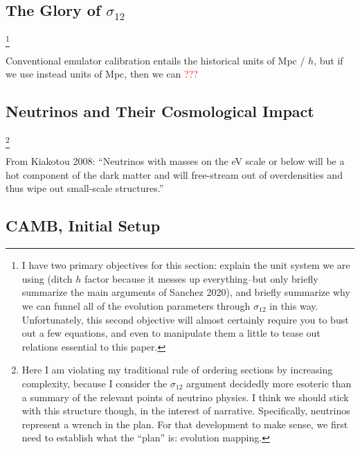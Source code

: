 \documentclass[11pt]{article}
\begin{document}
\begin{centering}
\section*{The Glory of $\sigma_{12}$}
\end{centering}

\footnote{
    I have two primary objectives for this section: explain the unit system
    we are using (ditch $h$ factor because it messes up everything--but
    only briefly summarize the main arguments of Sanchez 2020), and briefly
    summarize why we can funnel all of the evolution parameters through
    $\sigma_{12}$ in this way. Unfortunately, this second objective will
    almost certainly require you to bust out a few equations, and even to
    manipulate them a little to tease out relations essential to this paper.
}

Conventional emulator calibration entails the historical units of Mpc / $h$,
but if we use instead units of Mpc, then we can \textcolor{red}{???} 

\begin{centering}
\section*{Neutrinos and Their Cosmological Impact}
\end{centering}

\footnote{
    Here I am violating my traditional rule of ordering sections by
    increasing complexity, because I consider the $\sigma_{12}$ argument
    decidedly more esoteric than a summary of the relevant points of neutrino
    physics. I think we should stick with this structure though, in the
    interest of narrative. Specifically, neutrinos represent a wrench in the
    plan. For that development to make sense, we first need to establish what
    the ``plan'' is: evolution mapping.
}

From Kiakotou 2008: ``Neutrinos with masses on the eV scale or below will be a
hot component of the dark matter and will free-stream out of overdensities and
thus wipe out small-scale structures.''

\begin{centering}
\section*{CAMB, Initial Setup}
\end{centering}
\end{document}
